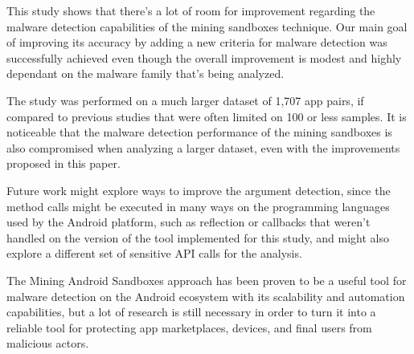 This study shows that there's a lot of room for improvement regarding the malware detection capabilities of the mining sandboxes technique. Our main goal of improving its accuracy by adding a new criteria for malware detection was successfully achieved even though the overall improvement is modest and highly dependant on the malware family that's being analyzed.

The study was performed on a much larger dataset of 1,707 app pairs, if compared to previous studies that were often limited on 100 or less samples. It is noticeable that the malware detection performance of the mining sandboxes is also compromised when analyzing a larger dataset, even with the improvements proposed in this paper.

Future work might explore ways to improve the argument detection, since the method calls might be executed in many ways on the programming languages used by the Android platform, such as reflection or callbacks that weren't handled on the version of the tool implemented for this study, and might also  explore a different set of sensitive API calls for the analysis.

The Mining Android Sandboxes approach has been proven to be a useful tool for malware detection on the Android ecosystem with its scalability and automation capabilities, but a lot of research is still necessary in order to turn it into a reliable tool for protecting app marketplaces, devices, and final users from malicious actors.